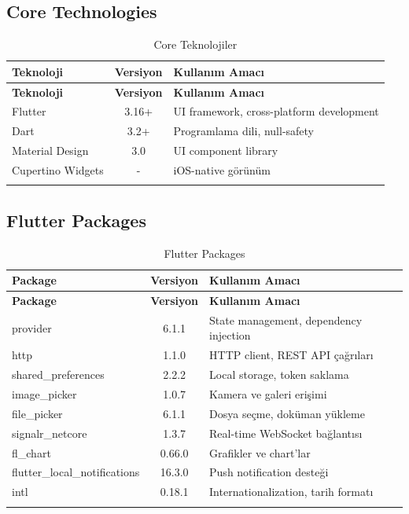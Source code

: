\documentclass[12pt,a4paper]{article}
\begin{document}
\subsection{Core Technologies}

\begin{longtable}{|l|c|p{7cm}|}
\hline
\textbf{Teknoloji} & \textbf{Versiyon} & \textbf{Kullanım Amacı} \\
\hline
\endfirsthead
\hline
\textbf{Teknoloji} & \textbf{Versiyon} & \textbf{Kullanım Amacı} \\
\hline
\endhead
Flutter & 3.16+ & UI framework, cross-platform development \\
\hline
Dart & 3.2+ & Programlama dili, null-safety \\
\hline
Material Design & 3.0 & UI component library \\
\hline
Cupertino Widgets & - & iOS-native görünüm \\
\hline
\caption{Core Teknolojiler}
\end{longtable}

\subsection{Flutter Packages}

\begin{longtable}{|l|c|p{7cm}|}
\hline
\textbf{Package} & \textbf{Versiyon} & \textbf{Kullanım Amacı} \\
\hline
\endfirsthead
\hline
\textbf{Package} & \textbf{Versiyon} & \textbf{Kullanım Amacı} \\
\hline
\endhead
provider & 6.1.1 & State management, dependency injection \\
\hline
http & 1.1.0 & HTTP client, REST API çağrıları \\
\hline
shared\_preferences & 2.2.2 & Local storage, token saklama \\
\hline
image\_picker & 1.0.7 & Kamera ve galeri erişimi \\
\hline
file\_picker & 6.1.1 & Dosya seçme, doküman yükleme \\
\hline
signalr\_netcore & 1.3.7 & Real-time WebSocket bağlantısı \\
\hline
fl\_chart & 0.66.0 & Grafikler ve chart'lar \\
\hline
flutter\_local\_notifications & 16.3.0 & Push notification desteği \\
\hline
intl & 0.18.1 & Internationalization, tarih formatı \\
\hline
\caption{Flutter Packages}
\end{longtable}
\end{document}

